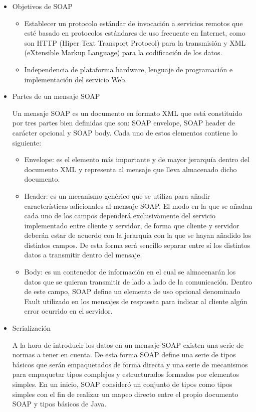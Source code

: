 \begin{itemize}

\item Objetivos de SOAP 
\begin{itemize}
	
\item Establecer un protocolo estándar de invocación a servicios remotos que esté basado en protocolos estándares de uso frecuente en Internet, como son HTTP (Hiper Text Transport Protocol) para la transmisión y XML (eXtensible Markup Language) para la codificación de los datos. 

\item Independencia de plataforma hardware, lenguaje de programación e implementación del servicio Web.
\end{itemize}

\item Partes de un mensaje SOAP
 
Un mensaje SOAP es un documento en formato XML que está constituido por tres partes bien definidas que son: 
SOAP envelope, SOAP header de carácter opcional y SOAP body. Cada uno de estos elementos contiene lo siguiente:
\begin{itemize} 
	
\item Envelope: es el elemento más importante y de mayor jerarquía dentro del documento XML y representa al mensaje que lleva almacenado dicho documento. 
\item Header: es un mecanismo genérico que se utiliza para añadir características adicionales al mensaje SOAP. El modo en la que se añadan cada uno de los campos dependerá exclusivamente del servicio implementado entre cliente y servidor, de forma que cliente y servidor deberán estar de acuerdo con la jerarquía con la que se hayan añadido los distintos campos. De esta forma será sencillo separar entre sí los distintos datos a transmitir dentro del mensaje. 
\item Body: es un contenedor de información en el cual se almacenarán los datos que se quieran transmitir de lado a lado de la comunicación. Dentro de este campo, SOAP define un elemento de uso opcional denominado Fault utilizado en los mensajes de respuesta para indicar al cliente algún error ocurrido en el servidor.
\end{itemize}

\item Serialización 

A la hora de introducir los datos en un mensaje SOAP existen una serie de normas a tener en cuenta. De esta forma SOAP define una serie de tipos básicos que serán empaquetados de forma directa y una serie de mecanismos para empaquetar tipos complejos y estructurados formados por elementos simples. En un inicio, SOAP consideró un conjunto de tipos como tipos simples con el fin de realizar un mapeo directo entre el propio documento SOAP y tipos básicos de Java.\cite{WEB5}
\end{itemize}

